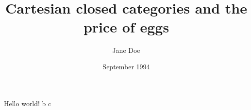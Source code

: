 \documentclass{article}
\title{Cartesian closed categories and the price of eggs}
\author{Jane Doe}
\date{September 1994}
\begin{document}
\maketitle
Hello world!
\pagebreak
b
\pagebreak
c
\end{document}
